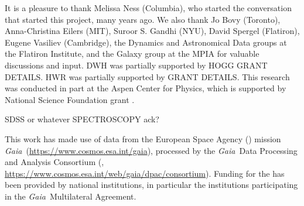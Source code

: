 \documentclass[modern]{aastex63}
\newcommand{\gaia}{\textsl{Gaia}}
\newcommand{\apogee}{\acronym{APOGEE}}
\newcommand{\sdss}{\acronym{SDSS}}
\begin{document}
\acknowledgments
It is a pleasure to thank
  Melissa Ness (Columbia),
  who started the conversation that started this project, many years ago.
We also thank
  Jo Bovy (Toronto),
  Anna-Christina Eilers (MIT),
  Suroor S. Gandhi (NYU),
  David Spergel (Flatiron),
  Eugene Vasiliev (Cambridge),
  the Dynamics and Astronomical Data groups at the Flatiron Institute,
  and the Galaxy group at the MPIA
for valuable discussions and input.
DWH was partially supported by HOGG GRANT DETAILS.
HWR was partially supported by GRANT DETAILS.
This research was conducted in part at the Aspen Center for Physics,
which is supported by National Science Foundation grant .

SDSS or whatever SPECTROSCOPY ack?

This work has made use of data from the European Space Agency ()
mission \gaia\ (\url{https://www.cosmos.esa.int/gaia}), processed by the \gaia\
Data Processing and Analysis Consortium (,
\url{https://www.cosmos.esa.int/web/gaia/dpac/consortium}). Funding for the
\acronym{DPAC}
has been provided by national institutions, in particular the institutions
participating in the \gaia\ Multilateral Agreement.





\end{document}
